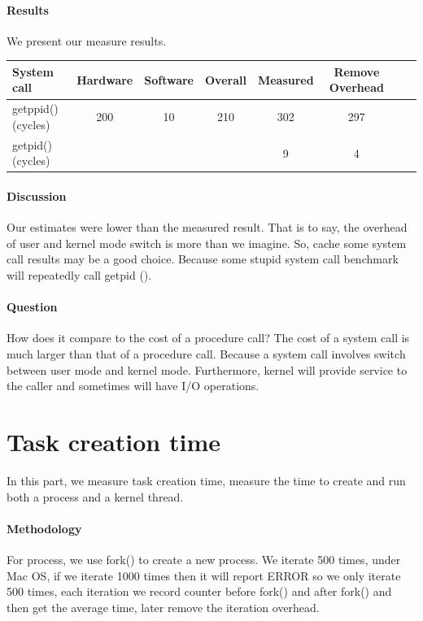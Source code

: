\paragraph{Results}
We present our measure results.

\begin{center}
\begin{tabular}{l*{6}{c}r}
System call              & Hardware  & Software  & Overall  & Measured & Remove Overhead  \\
\hline
getppid() (cycles) & 200 & 10 & 210 & 302 & 297  \\
getpid() (cycles) & ~ & ~ & ~ & 9 & 4  \\
\end{tabular}
\end{center}

\paragraph{Discussion}
Our estimates were lower than the measured result. That is to say, the overhead of user and kernel mode switch is more than we imagine. So, cache some system call results may be a good choice. Because some stupid system call benchmark will repeatedly call getpid ().

\paragraph{Question} How does it compare to the cost of a procedure call? The cost of a system call is much larger than that of a procedure call. Because a system call involves switch between user mode and kernel mode. Furthermore, kernel will provide service to the caller and sometimes will have I/O operations.

\section{Task creation time}
In this part, we measure task creation time, measure the time to create and run both a process and a kernel thread.

\paragraph{Methodology}
For process, we use fork() to create a new process. We iterate 500 times, under Mac OS, if we iterate 1000 times then it will report ERROR so we only iterate 500 times, each iteration we record counter before fork() and after fork() and then get the average time, later remove the iteration overhead.


